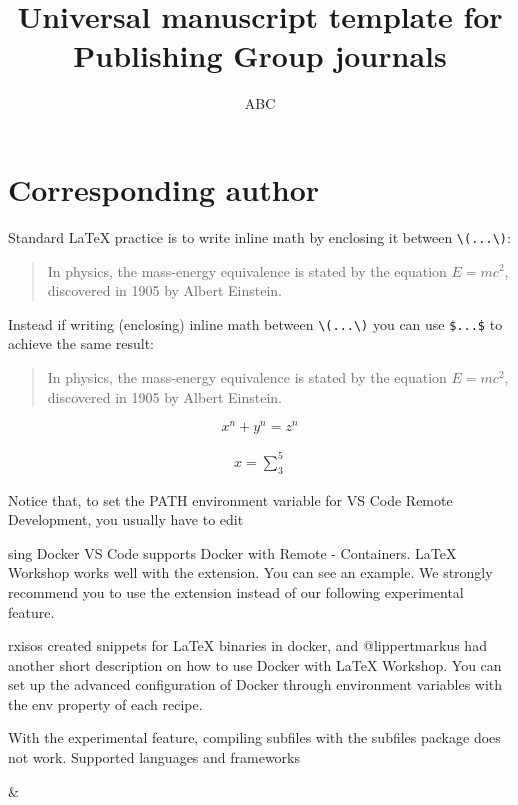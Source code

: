 \documentclass{article}
\begin{document}
\title{Universal manuscript template for Publishing Group journals}
\author{ABC}
\maketitle

\section{Corresponding author}

\noindent Standard \LaTeX{} practice is to write inline math by enclosing it between \verb|\(...\)|:

\begin{quote}
In physics, the mass-energy equivalence is stated 
by the equation \(E=mc^2\), discovered in 1905 by Albert Einstein.
\end{quote}

\noindent Instead if writing (enclosing) inline math between \verb|\(...\)| you can use \texttt{\$...\$} to achieve the same result:

\begin{quote}
In physics, the mass-energy equivalence is stated 
by the equation $E=mc^2$, discovered in 1905 by Albert Einstein.
\end{quote}

\lipsum

\[ x^n + y^n = z^n \]


\begin{align}
x = \sum_{3}^{5}
\end{align}

Notice that, to set the PATH environment variable for VS Code Remote Development, you usually have to edit

sing Docker
VS Code supports Docker with Remote - Containers. LaTeX Workshop works well with the extension. You can see an example. We strongly recommend you to use the extension instead of our following experimental feature.


rxisos created snippets for LaTeX binaries in docker, and @lippertmarkus had another short description on how to use Docker with LaTeX Workshop. You can set up the advanced configuration of Docker through environment variables with the env property of each recipe.

With the experimental feature, compiling subfiles with the subfiles package does not work.
Supported languages and frameworks

\&
\end{document}
